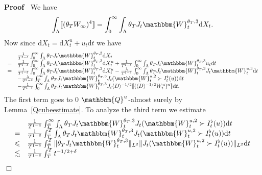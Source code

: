\documentclass[11pt]{article}
\newcommand{\mathd}{\mathrm{d}}
\newenvironment{proof}{\noindent\textbf{Proof\ }}{\hspace*{\fill}$\Box$\medskip}
\begin{document}
\begin{proof}
  We have
  \[ \int_{\Lambda} \llbracket (\theta_T W_{\infty})^4 \rrbracket =
     \int^{\infty}_0 \int_{\Lambda} \theta_T J_t \mathbbm{W}_t^{\theta_T, 3}
     \mathd X_t . \]
  Now since $\mathd X_t = \mathd X_t^u + u_t \mathd t$ we have
  \[ \begin{array}{ll}
       & \frac{1}{T^{1 - \delta}} \int^{\infty}_0 \int_{\Lambda} \theta_T J_t
       \mathbbm{W}_t^{\theta_T, 3} \mathd X_t\\
       = & \frac{1}{T^{1 - \delta}} \int^{\infty}_0 \int_{\Lambda} \theta_T
       J_t \mathbbm{W}_t^{\theta_T, 3} \mathd X^u_t + \frac{1}{T^{1 - \delta}}
       \int^{\infty}_0 \int_{\Lambda} \theta_T J_t \mathbbm{W}_t^{\theta_T, 3}
       u_t \mathd t\\
       = & \frac{1}{T^{1 - \delta}} \int^{\infty}_0 \int_{\Lambda} \theta_T
       J_t \mathbbm{W}_t^{\theta_T, 3} \mathd X^u_t - \frac{\lambda}{T^{1 -
       \delta}} \int^{\infty}_0 \int_{\Lambda} \theta_T J_t
       \mathbbm{W}_t^{\theta_T, 3} J_t \mathbbm{W}_t^{u, 3} \mathd t\\
       & - \frac{\lambda}{T^{1 - \delta}} \int^{\infty}_{\bar{T}}
       \int_{\Lambda} \theta_T J_t \mathbbm{W}_t^{\theta_T, 3} J_t
       (\mathbbm{W}_t^{u, 2} \succ I^{\flat}_t (u)) \mathd t\\
       & - \frac{1}{T^{1 - \delta}} \int^{\infty}_0 \int_{\Lambda} \theta_T
       J_t \mathbbm{W}_t^{\theta_T, 3} J_t \langle D \rangle^{- 1 / 2}
       \llbracket (\langle D \rangle^{- 1 / 2} W^u_t)^n \rrbracket \mathd t.
     \end{array} \]
  The first term goes to $0$ $\mathbbm{Q}^u$-almost surely by
  Lemma~\ref{Qcubeestimate}. To analyze the third term we estimate
  \begin{equation}
    \begin{array}{ll}
      & \frac{1}{T^{1 - \delta}} \int^{\infty}_{\bar{T}} \int_{\Lambda}
      \theta_T J_t \mathbbm{W}_t^{\theta_T, 3} J_t (\mathbbm{W}_t^{u, 2} \succ
      I^{\flat}_t (u)) \mathd t\\
      = & \frac{1}{T^{1 - \delta}} \int^T_{\bar{T}} \int_{\Lambda} \theta_T
      J_t \mathbbm{W}_t^{\theta_T, 3} J_t (\mathbbm{W}_t^{u, 2} \succ
      I^{\flat}_t (u)) \mathd t\\
      \leqslant & \frac{1}{T^{1 - \delta}} \int^T_{\bar{T}} \| \theta_T J_t
      \mathbbm{W}_t^{\theta_T, 3} \|_{L^2} \| J_t (\mathbbm{W}_t^{u, 2} \succ
      I^{\flat}_t (u)) \|_{L^2} \mathd t\\
      \lesssim & \frac{1}{T^{1 - \delta}} \int^T_{\bar{T}} t^{- 1 / 2 + \delta
}
\end{array}
\end{equation}
\end{proof}
\end{document}
